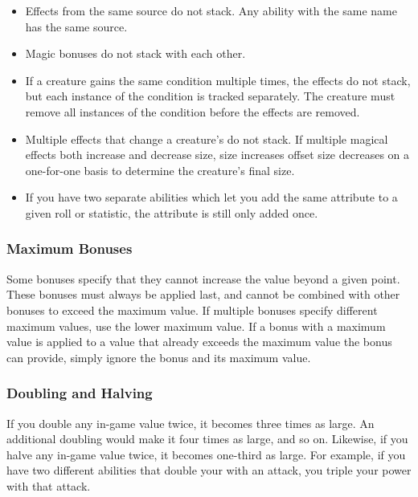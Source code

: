 
            \begin{itemize}
                \item Effects from the same source do not stack. Any ability with the same name has the same source.
                \item Magic bonuses do not stack with each other.
                \item If a creature gains the same condition multiple times, the effects do not stack, but each instance of the condition is tracked separately.
                    The creature must remove all instances of the condition before the effects are removed.
                \item Multiple  effects that change a creature's  do not stack.
                    If multiple magical effects both increase and decrease size, size increases offset size decreases on a one-for-one basis to determine the creature's final size.
                \item If you have two separate abilities which let you add the same attribute to a given roll or statistic, the attribute is still only added once.
            \end{itemize}

        \subsubsection{Maximum Bonuses}\label{Ability Limits}
            Some bonuses specify that they cannot increase the value beyond a given point.
            These bonuses must always be applied last, and cannot be combined with other bonuses to exceed the maximum value.
            If multiple bonuses specify different maximum values, use the lower maximum value.
            If a bonus with a maximum value is applied to a value that already exceeds the maximum value the bonus can provide, simply ignore the bonus and its maximum value.

        \subsubsection{Doubling and Halving}\label{Doubling and Halving}
            If you double any in-game value twice, it becomes three times as large.
            An additional doubling would make it four times as large, and so on.
            Likewise, if you halve any in-game value twice, it becomes one-third as large.
            For example, if you have two different abilities that double your  with an attack, you triple your power with that attack.

